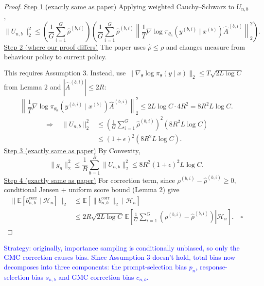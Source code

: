 \documentclass[10pt]{article}
\newcommand{\E}{\mathbb{E}}
\newcommand{\Hh}{\mathcal{H}}
\newcommand{\grad}{\nabla}
\newcommand{\xs}{x^{(b)}}
\newcommand{\ys}{y^{(b,i)}}
\newcommand{\Ab}{\widehat A^{(b,i)}}
\newcommand{\rh}{\widehat\rho^{(b,i)}}
\newcommand{\rb}{\rho^{(b,i)}}
\theoremstyle{preserved}
\begin{document}
\begin{proof} \underline{Step 1 (exactly same as paper)} Applying weighted Cauchy--Schwarz to $U_{n,b}$,
\begin{equation*}
\|U_{n,b}\|_2^2\le\left(\frac1G\sum_{i=1}^G\rh\right)
\left(\frac1G\sum_{i=1}^G\rh\left\|\frac1T\grad\log\pi_{\theta_n}(\ys\mid\xs)\Ab\right\|_2^2\right).
\end{equation*}
\underline{Step 2 (where our proof differs)} The paper uses $\hat\rho\le\rho$ and changes measure from behaviour policy to current policy.

This requires Assumption 3. Instead, use $\|\grad_\theta\log\pi_\theta(y\mid x)\|_2\le T\sqrt{2L\log C}$ from Lemma 2 and $|\Ab|\le2R$:
\begin{equation*}
\left\|\frac1T\grad\log\pi_{\theta_n}(\ys\mid\xs)\Ab\right\|_2^2
\le2L\log C\cdot4R^2=8R^2L\log C.
\end{equation*}
\begin{equation}\label{eq:score-bound}
\begin{aligned}
\Rightarrow\quad\|U_{n,b}\|_2^2
&\le\left(\frac1G\sum_{i=1}^G\rh\right)^2(8R^2L\log C)\\
&\le(1+\epsilon)^2(8R^2L\log C).\qquad
\end{aligned}
\end{equation}
\underline{Step 3 (exactly same as paper)} By Convexity,
\begin{equation*}
\|g_n\|_2^2\le\frac1B\sum_{b=1}^B\|U_{n,b}\|_2^2\le8R^2(1+\epsilon)^2L\log C.
\end{equation*}
\underline{Step 4 (exactly same as paper)} For correction term, since $\rb-\rh\ge0$, conditional Jensen + uniform score bound (Lemma 2) give
\begin{equation*}
\begin{aligned}
\|\E[b_{n,b}^{\mathrm{corr}}\mid\Hh_n]\|_2
&\le\E[\|b_{n,b}^{\mathrm{corr}}\|_2\mid\Hh_n]\\
&\le2R\sqrt{2L\log C}\,\E\left[\left.\frac1G\sum_{i=1}^G(\rb-\rh)\right|\Hh_n\right].\quad\square
\end{aligned}
\end{equation*}

\end{proof}

\textcolor{blue}{Strategy: originally, importance sampling is conditionally unbiased, so only the GMC correction causes bias. Since Assumption 3 doesn't hold, total bias now decomposes into three components: the prompt-selection bias $p_n$, response-selection bias $s_{n,b}$ and GMC correction bias $c_{n,b}$.}
\end{document}
